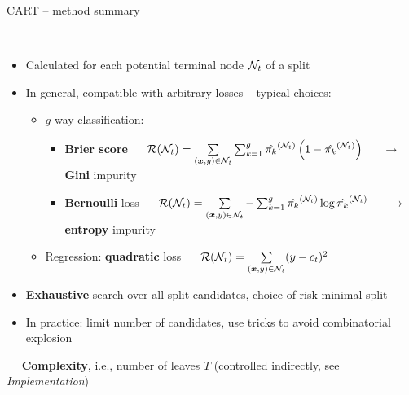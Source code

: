 \begin{frame}{CART -- method summary}

\footnotesize

 \\

\begin{itemize}
  \item Calculated for each potential terminal node $\mathcal{N}_t$
  of a split
  \item In general, compatible with arbitrary losses -- typical choices:
  \begin{itemize}
    \footnotesize
    \item $g$-way classification:
    \begin{itemize}
      \footnotesize
      \item \textbf{Brier score} ~~
      $\mathcal{R}(\mathcal{N}_t) = \sum\limits_{(\bm{x},y) \in \mathcal{N}_t} \sum_{k=1}^g
      \hat{\pi_k}^{(\mathcal{N}_t)} \left(1 - \hat{\pi_k}^{(\mathcal{N}_t)} \right)$
      ~~ $\rightarrow$ \textbf{Gini} impurity
      \item \textbf{Bernoulli} loss ~~
      $\mathcal{R}(\mathcal{N}_t) = \sum\limits_{(\bm{x},y) \in \mathcal{N}_t} - \sum_{k=1}^g
      \hat{\pi_k}^{(\mathcal{N}_t)} \log \hat{\pi_k}^{(\mathcal{N}_t)}$
      ~~ $\rightarrow$ \textbf{entropy} impurity
    \end{itemize}
    \item Regression: \textbf{quadratic} loss ~~
    $\mathcal{R}(\mathcal{N}_t) = \sum\limits_{(\bm{x},y) \in \mathcal{N}_t} (y - c_t)^2$
  \end{itemize}
\end{itemize}

\medskip


\begin{itemize}
  \item \textbf{Exhaustive} search over all split candidates, choice of 
  risk-minimal split
  \item In practice: limit number of candidates, use tricks to avoid 
  combinatorial explosion
\end{itemize}

\medskip

 ~~ \textbf{Complexity}, i.e., 
number of leaves $T$ (controlled indirectly, see \textit{Implementation}) 

\end{frame}

